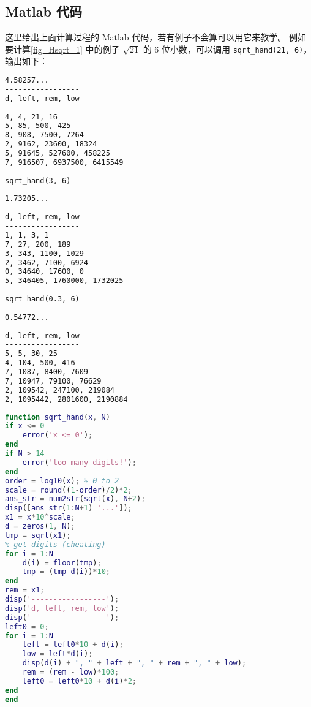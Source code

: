 \subsection{Matlab 代码}
这里给出上面计算过程的 Matlab 代码，若有例子不会算可以用它来教学。 例如要计算\autoref{fig_Hsqrt_1} 中的例子 $\sqrt{21}$ 的 6 位小数，可以调用 \verb|sqrt_hand(21, 6)|， 输出如下：
\begin{lstlisting}[language=bash]
4.58257...
-----------------
d, left, rem, low
-----------------
4, 4, 21, 16
5, 85, 500, 425
8, 908, 7500, 7264
2, 9162, 23600, 18324
5, 91645, 527600, 458225
7, 916507, 6937500, 6415549
\end{lstlisting}
\verb|sqrt_hand(3, 6)|
\begin{lstlisting}[language=bash]
1.73205...
-----------------
d, left, rem, low
-----------------
1, 1, 3, 1
7, 27, 200, 189
3, 343, 1100, 1029
2, 3462, 7100, 6924
0, 34640, 17600, 0
5, 346405, 1760000, 1732025
\end{lstlisting}
\verb|sqrt_hand(0.3, 6)|
\begin{lstlisting}[language=bash]
0.54772...
-----------------
d, left, rem, low
-----------------
5, 5, 30, 25
4, 104, 500, 416
7, 1087, 8400, 7609
7, 10947, 79100, 76629
2, 109542, 247100, 219084
2, 1095442, 2801600, 2190884
\end{lstlisting}

\begin{lstlisting}[language=matlab,caption=sqrt\_hand.m]
function sqrt_hand(x, N)
if x <= 0
    error('x <= 0');
end
if N > 14
    error('too many digits!');
end
order = log10(x); % 0 to 2
scale = round((1-order)/2)*2;
ans_str = num2str(sqrt(x), N+2);
disp([ans_str(1:N+1) '...']);
x1 = x*10^scale;
d = zeros(1, N);
tmp = sqrt(x1);
% get digits (cheating)
for i = 1:N
    d(i) = floor(tmp);
    tmp = (tmp-d(i))*10;
end
rem = x1;
disp('-----------------');
disp('d, left, rem, low');
disp('-----------------');
left0 = 0;
for i = 1:N
    left = left0*10 + d(i);
    low = left*d(i);
    disp(d(i) + ", " + left + ", " + rem + ", " + low);
    rem = (rem - low)*100;
    left0 = left0*10 + d(i)*2;
end
end
\end{lstlisting}
